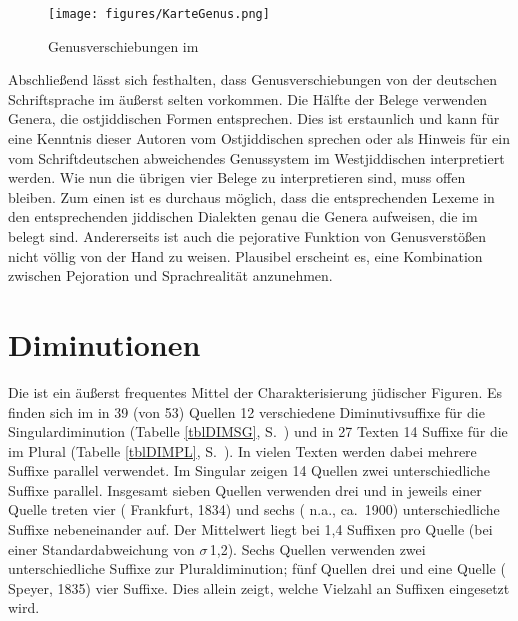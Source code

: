 \begin{figure} 

\texttt{[image: figures/KarteGenus.png]}
		\caption{\label{KarteGenus} Genusverschiebungen im }
	\end{figure}
 
	 

Abschließend lässt sich festhalten, dass Genusverschiebungen von der deutschen Schriftsprache im \hai{{\LiJieins}} äußerst selten vorkommen. Die Hälfte der Belege verwenden Genera, die ostjiddischen Formen entsprechen. Dies ist erstaunlich und kann für eine Kenntnis dieser Autoren vom Ostjiddischen sprechen oder als Hinweis für ein vom Schriftdeutschen abweichendes Genussystem im Westjiddischen interpretiert werden. Wie nun die übrigen vier Belege zu interpretieren sind, muss offen bleiben. Zum einen ist es durchaus möglich, dass die entsprechenden Lexeme in den entsprechenden jiddischen Dialekten genau die Genera aufweisen, die im \hai{{\LiJieins}} belegt sind. Andererseits ist auch die pejorative Funktion von Genusverstößen nicht völlig von der Hand zu weisen. 
Plausibel erscheint es, eine Kombination zwischen Pejoration und Sprachrealität anzunehmen.


  \section{Diminutionen}\label{dim}
Die  ist ein äußerst frequentes Mittel der Charakterisierung jüdischer Figuren. Es finden sich im  in 39 (von 53) Quellen 12 verschiedene Diminutivsuffixe für die Singulardiminution (Tabelle \ref{tblDIMSG}, S.\, \pageref{tblDIMSG}) und in 27 Texten 14 Suffixe für die  im Plural (Tabelle \ref{tblDIMPL}, S.\, \pageref{tblDIMPL}). In vielen Texten werden dabei mehrere Suffixe parallel verwendet. Im Singular zeigen 14 Quellen zwei unterschiedliche Suffixe parallel. Insgesamt sieben Quellen verwenden drei und in jeweils einer Quelle treten vier ( Frankfurt, 1834) und sechs ( n.a., ca.\, 1900) unterschiedliche Suffixe nebeneinander auf. Der Mittelwert liegt bei 1,4 Suffixen pro Quelle (bei einer Standardabweichung von {$\sigma$}\,1,2). Sechs Quellen verwenden zwei unterschiedliche Suffixe zur Pluraldiminution; fünf Quellen drei und eine Quelle ( Speyer, 1835) vier Suffixe. Dies allein zeigt, welche Vielzahl an Suffixen eingesetzt wird.\label{AnzahlDIM}

